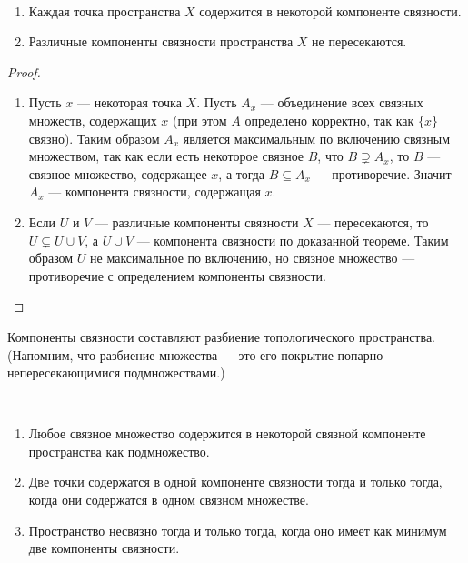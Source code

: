 \documentclass[12pt,a4paper]{article}
\begin{document}
    \begin{theorem}\ 
        \begin{enumerate}
            \item Каждая точка пространства $X$ содержится в некоторой компоненте связности.
            \item Различные компоненты связности пространства $X$ не пересекаются.
        \end{enumerate}
    \end{theorem}

    \begin{proof}
        \begin{enumerate}
            \item Пусть $x$ --- некоторая точка $X$. Пусть $A_x$ --- объединение всех связных множеств, содержащих $x$ (при этом $A$ определено корректно, так как $\{x\}$ связно). Таким образом $A_x$ является максимальным по включению связным множеством, так как если есть некоторое связное $B$, что $B \supsetneq A_x$, то $B$ --- связное множество, содержащее $x$, а тогда $B \subseteq A_x$ --- противоречие. Значит $A_x$ --- компонента связности, содержащая $x$.

            \item Если $U$ и $V$ --- различные компоненты связности $X$ --- пересекаются, то $U \subsetneq U \cup V$, а $U \cup V$ --- компонента связности по доказанной теореме. Таким образом $U$ не максимальное по включению, но связное множество --- противоречие с определением компоненты связности.
        \end{enumerate}
    \end{proof}

    \begin{corollary}
        Компоненты связности составляют разбиение топологического пространства. (Напомним, что разбиение множества --- это его покрытие попарно непересекающимися подмножествами.)
    \end{corollary}

    \begin{corollary}\ 
        \begin{enumerate}
            \item Любое связное множество содержится в некоторой связной компоненте пространства как подмножество.
            \item Две точки содержатся в одной компоненте связности тогда и только тогда, когда они содержатся в одном связном множестве.
            \item Пространство несвязно тогда и только тогда, когда оно имеет как минимум две компоненты связности.
        \end{enumerate}
    \end{corollary}
\end{document}
